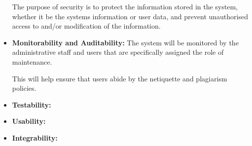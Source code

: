 \begin{flushleft}
\begin{itemize}
The purpose of security is to protect the information stored in the system, whether it be the systems information or user data, and prevent unauthorised access to and/or modification of the information.
\newline
 
		\item \textbf{Monitorability and Auditability:} 
The system will be monitored by the administrative staff and users that are specifically assigned the role of maintenance. \newline

This will help ensure that users abide by the netiquette and plagiarism policies.  \newline
			
		\item \textbf{Testability:} 
		\item \textbf{Usability:} 
		\item \textbf{Integrability:} 
	\end{itemize}
	
\end{flushleft}

